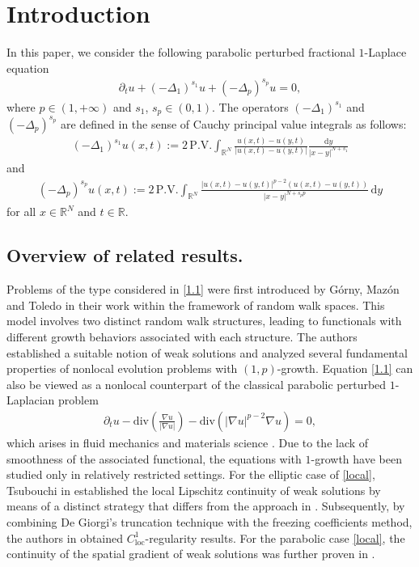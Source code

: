 \documentclass[reqno,10pt]{amsart}
\numberwithin{equation}{section}
\begin{document}
\section{Introduction}
\label{sec1}

In this paper, we consider the following parabolic perturbed fractional $1$-Laplace equation
\begin{align}
	\label{1.1}
	\partial_t u+(-\Delta_1)^{s_1}u+(-\Delta_p)^{s_p}u=0,
\end{align}
where $p\in (1, +\infty)$ and $s_1$, $s_p\in (0, 1)$. The operators $(-\Delta_1)^{s_1}$ and $(-\Delta_p)^{s_p}$ are defined in the sense of Cauchy principal value integrals as follows:
\begin{align*}
	(-\Delta_1)^{s_1}u(x,t):=2\,\mathrm{P.V.}\int_{\mathbb{R}^N}\frac{u(x,t)-u(y,t)}{|u(x,t)-u(y,t)|}\frac{\mathrm{d}y}{|x-y|^{N+s_1}}
\end{align*}
and
\begin{align*}
	(-\Delta_p)^{s_p}u(x,t):=2\,\mathrm{P.V.}\int_{\mathbb{R}^N}\frac{|u(x,t)-u(y,t)|^{p-2}(u(x,t)-u(y,t))}{|x-y|^{N+s_pp}}\,\mathrm{d}y
\end{align*}
for all $x\in \mathbb {R}^N$ and $t\in \mathbb {R}$.

\subsection{Overview of related results.}

Problems of the type considered in \eqref{1.1} were first introduced by G\'{o}rny, Maz\'{o}n and Toledo in their work \cite{GMT24} within the framework of random walk spaces. This model involves two distinct random walk structures, leading to functionals with different growth behaviors associated with each structure. The authors established a suitable notion of weak solutions and analyzed several fundamental properties of nonlocal evolution problems with $(1, p)$-growth. Equation \eqref{1.1} can also be viewed as a nonlocal counterpart of the classical parabolic perturbed $1$-Laplacian problem
\begin{align}
	\label{local}
	\partial_t u-\mathrm{div}\left( \frac{\nabla u}{|\nabla u|}\right)-\mathrm{div}\left( |\nabla u|^{p-2}\nabla u\right)=0,  
\end{align}
which arises in fluid mechanics \cite{DL76} and materials science \cite{S93}. Due to the lack of smoothness of the associated functional, the equations with $1$-growth have been studied only in relatively restricted settings. For the elliptic case of \eqref{local}, Tsubouchi in \cite{T21}  established the local Lipschitz continuity of weak solutions by means of a distinct strategy that differs from the approach in \cite{BM20}. Subsequently, by combining De Giorgi’s truncation technique with the freezing coefficients method, the authors in \cite{TG22, T24} obtained $C^1_\mathrm{loc}$-regularity results. For the parabolic case \eqref{local}, the continuity of the spatial gradient of weak solutions was further proven in \cite{T25, T24A, T25A}. 
\end{document}
